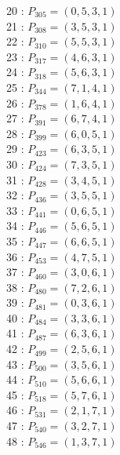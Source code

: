 \documentclass{article}
\begin{document}
{\begin{multicols}{2}
20 : $P_{305}=( 0, 5, 3, 1 )$\\
21 : $P_{308}=( 3, 5, 3, 1 )$\\
22 : $P_{310}=( 5, 5, 3, 1 )$\\
23 : $P_{317}=( 4, 6, 3, 1 )$\\
24 : $P_{318}=( 5, 6, 3, 1 )$\\
25 : $P_{344}=( 7, 1, 4, 1 )$\\
26 : $P_{378}=( 1, 6, 4, 1 )$\\
27 : $P_{391}=( 6, 7, 4, 1 )$\\
28 : $P_{399}=( 6, 0, 5, 1 )$\\
29 : $P_{423}=( 6, 3, 5, 1 )$\\
30 : $P_{424}=( 7, 3, 5, 1 )$\\
31 : $P_{428}=( 3, 4, 5, 1 )$\\
32 : $P_{436}=( 3, 5, 5, 1 )$\\
33 : $P_{441}=( 0, 6, 5, 1 )$\\
34 : $P_{446}=( 5, 6, 5, 1 )$\\
35 : $P_{447}=( 6, 6, 5, 1 )$\\
36 : $P_{453}=( 4, 7, 5, 1 )$\\
37 : $P_{460}=( 3, 0, 6, 1 )$\\
38 : $P_{480}=( 7, 2, 6, 1 )$\\
39 : $P_{481}=( 0, 3, 6, 1 )$\\
40 : $P_{484}=( 3, 3, 6, 1 )$\\
41 : $P_{487}=( 6, 3, 6, 1 )$\\
42 : $P_{499}=( 2, 5, 6, 1 )$\\
43 : $P_{500}=( 3, 5, 6, 1 )$\\
44 : $P_{510}=( 5, 6, 6, 1 )$\\
45 : $P_{518}=( 5, 7, 6, 1 )$\\
46 : $P_{531}=( 2, 1, 7, 1 )$\\
47 : $P_{540}=( 3, 2, 7, 1 )$\\
48 : $P_{546}=( 1, 3, 7, 1 )$\\
\end{multicols}
}
\end{document}
